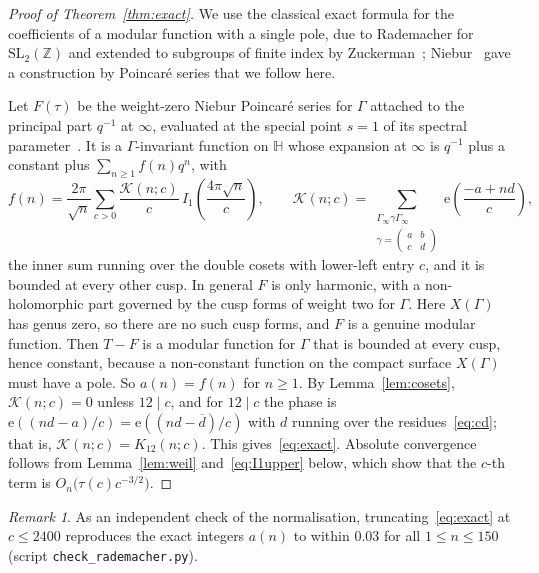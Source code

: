 \documentclass[11pt]{amsart}
\numberwithin{equation}{section}
\theoremstyle{definition}
\theoremstyle{remark}
\newtheorem{remark}[theorem]{Remark}
\newcommand{\e}{\mathrm{e}}
\newcommand{\SL}{\mathrm{SL}}
\newcommand{\Z}{\mathbb{Z}}
\newcommand{\inv}[1]{\overline{#1}}
\begin{document}
\begin{proof}[Proof of Theorem~\ref{thm:exact}]
We use the classical exact formula for the coefficients of a modular function with a single pole, due to Rademacher for $\SL_2(\Z)$ and extended to subgroups of finite index by Zuckerman~\cite{Zuckerman}; Niebur~\cite{Niebur} gave a construction by Poincaré series that we follow here.

Let $F(\tau)$ be the weight-zero Niebur Poincaré series for $\Gamma$ attached to the principal part $q^{-1}$ at $\infty$, evaluated at the special point $s=1$ of its spectral parameter~\cite{Niebur}. It is a $\Gamma$-invariant function on $\mathbb H$ whose expansion at $\infty$ is $q^{-1}$ plus a constant plus $\sum_{n\ge1}f(n)q^n$, with
\begin{equation}\label{eq:niebur}
f(n)=\frac{2\pi}{\sqrt n}\sum_{c>0}\frac{\mathcal K(n;c)}{c}\,I_1\!\left(\frac{4\pi\sqrt n}{c}\right),\qquad
\mathcal K(n;c)=\sum_{\substack{\Gamma_\infty\gamma\Gamma_\infty\\ \gamma=\left(\begin{smallmatrix}a&b\\c&d\end{smallmatrix}\right)}}\e\!\left(\frac{-a+nd}{c}\right),
\end{equation}
the inner sum running over the double cosets with lower-left entry $c$, and it is bounded at every other cusp. In general $F$ is only harmonic, with a non-holomorphic part governed by the cusp forms of weight two for $\Gamma$. Here $X(\Gamma)$ has genus zero, so there are no such cusp forms, and $F$ is a genuine modular function. Then $T-F$ is a modular function for $\Gamma$ that is bounded at every cusp, hence constant, because a non-constant function on the compact surface $X(\Gamma)$ must have a pole. So $a(n)=f(n)$ for $n\ge1$. By Lemma~\ref{lem:cosets}, $\mathcal K(n;c)=0$ unless $12\mid c$, and for $12\mid c$ the phase is $\e((nd-a)/c)=\e((nd-\inv d)/c)$ with $d$ running over the residues~\eqref{eq:cd}; that is, $\mathcal K(n;c)=K_{12}(n;c)$. This gives~\eqref{eq:exact}. Absolute convergence follows from Lemma~\ref{lem:weil} and~\eqref{eq:I1upper} below, which show that the $c$-th term is $O_n\bigl(\tau(c)c^{-3/2}\bigr)$.
\end{proof}

\begin{remark}
As an independent check of the normalisation, truncating~\eqref{eq:exact} at $c\le 2400$ reproduces the exact integers $a(n)$ to within $0.03$ for all $1\le n\le150$ (script \texttt{check\_rademacher.py}).
\end{remark}
\end{document}
